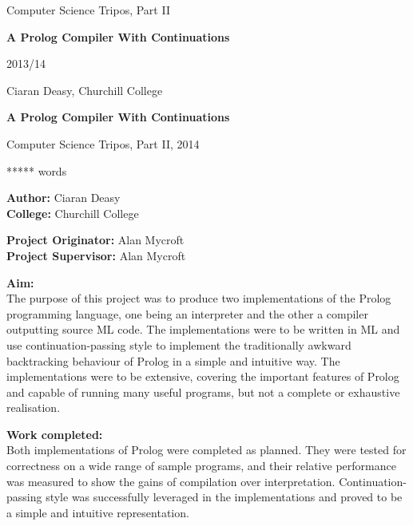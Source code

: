 \documentclass[12pt]{article}
\begin{document}
\thispagestyle{empty}

\medskip
{}
\medskip
{}

\vfil

\centerline{\large Computer Science Tripos, Part II}
\vspace{0.4in}
\centerline{\Large\bf A Prolog Compiler With Continuations}
\vspace{0.3in}
\centerline{\large 2013/14}
\vspace{2.5in}

\newpage
\hspace{5px}
\newpage

\vfil

\centerline{\large Ciaran Deasy, Churchill College}
\vspace{0.4in}
\centerline{\Large\bf A Prolog Compiler With Continuations}
\vspace{0.3in}
\centerline{\large Computer Science Tripos, Part II, 2014}
\vspace{0.1in}
\centerline{ ***** words} %
\vspace{0.25in}

{\bf Author:} Ciaran Deasy\\
{\bf College:} Churchill College

\vspace{0.25in}

{\bf Project Originator:} Alan Mycroft\\
{\bf Project Supervisor:} Alan Mycroft

\vspace{0.25in}

{\bf Aim:}\\
The purpose of this project was to produce two implementations of the Prolog programming language, one being an interpreter and the other a compiler outputting source ML code. 
The implementations were to be written in ML and use continuation-passing style to implement the traditionally awkward backtracking behaviour of Prolog in a simple and intuitive way. 
The implementations were to be extensive, covering the important features of Prolog and capable of running many useful programs, but not a complete or exhaustive realisation.

\vspace{0.20in}

{\bf Work completed:}\\
Both implementations of Prolog were completed as planned. 
They were tested for correctness on a wide range of sample programs, and their relative performance was measured to show the gains of compilation over interpretation. 
Continuation-passing style was successfully leveraged in the implementations and proved to be a simple and intuitive representation.
\end{document}
